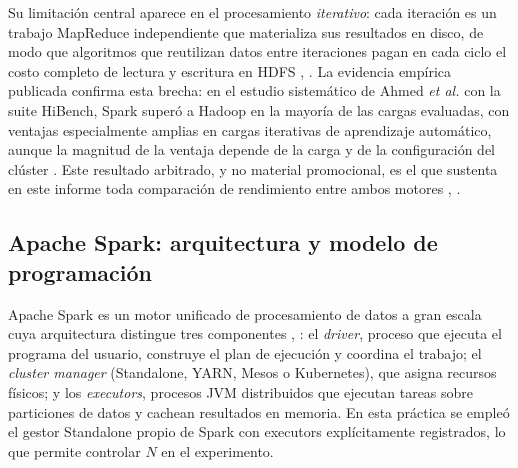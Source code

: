 \documentclass[10pt,journal]{IEEEtran}
\begin{document}
Su limitaci\'on central aparece en el procesamiento \emph{iterativo}: cada
iteraci\'on es un trabajo MapReduce independiente que materializa sus resultados
en disco, de modo que algoritmos que reutilizan datos entre iteraciones pagan en
cada ciclo el costo completo de lectura y escritura en HDFS \cite{zaharia2016},
\cite{shvachko2010}. La evidencia emp\'irica publicada confirma esta brecha: en el
estudio sistem\'atico de Ahmed \emph{et al.} con la suite HiBench, Spark
super\'o a Hadoop en la mayor\'ia de las cargas evaluadas, con ventajas
especialmente amplias en cargas iterativas de aprendizaje autom\'atico, aunque
la magnitud de la ventaja depende de la carga y de la configuraci\'on del
cl\'uster \cite{ahmed2020}. Este resultado arbitrado, y no material
promocional, es el que sustenta en este informe toda comparaci\'on de
rendimiento entre ambos motores \cite{ahmed2020}, \cite{zaharia2016}.

\subsection{Apache Spark: arquitectura y modelo de programaci\'on}
\label{sec:spark}
Apache Spark es un motor unificado de procesamiento de datos a gran escala cuya
arquitectura distingue tres componentes \cite{zaharia2016}, \cite{armbrust2015}:
el \emph{driver}, proceso que ejecuta el programa del usuario, construye el plan
de ejecuci\'on y coordina el trabajo; el \emph{cluster manager} (Standalone,
YARN, Mesos o Kubernetes), que asigna recursos f\'isicos; y los
\emph{executors}, procesos JVM distribuidos que ejecutan tareas sobre
particiones de datos y cachean resultados en memoria. En esta pr\'actica se
emple\'o el gestor Standalone propio de Spark con executors expl\'icitamente
registrados, lo que permite controlar $N$ en el experimento.
\end{document}
